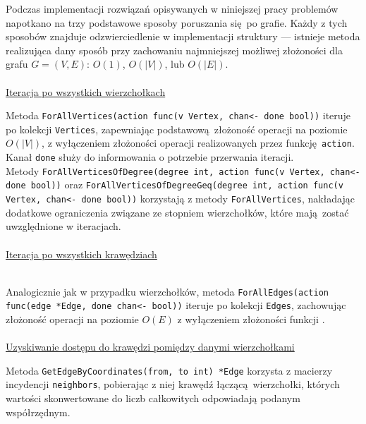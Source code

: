 {  Podczas implementacji rozwiązań opisywanych w niniejszej pracy problemów napotkano na trzy podstawowe sposoby poruszania się po grafie.
  Każdy z tych sposobów znajduje odzwierciedlenie w implementacji struktury --- istnieje metoda realizująca dany sposób przy zachowaniu najmniejszej możliwej złożoności dla grafu $G=(V, E)$: $O(1)$, $O(|V|)$, lub $O(|E|)$.
  \\\\\underline{Iteracja po wszystkich wierzchołkach}\\
  \par{
      Metoda \texttt{ForAllVertices(action func(v Vertex, chan<- done bool))} iteruje po kolekcji \texttt{Vertices}, zapewniając  podstawową złożoność operacji na poziomie $O(|V|)$, z wyłączeniem złożoności operacji realizowanych przez funkcję \texttt{action}. Kanał \texttt{done} służy do informowania o potrzebie przerwania iteracji.\\
      Metody \texttt{ForAllVerticesOfDegree(degree int, action func(v Vertex, chan<- done bool))} oraz \texttt{ForAllVerticesOfDegreeGeq(degree int, action func(v Vertex, chan<- done bool))} korzystają z metody \texttt{ForAllVertices}, nakładając dodatkowe ograniczenia związane ze stopniem wierzchołków, które mają zostać uwzględnione w iteracjach.
  }
  \\\\\underline{Iteracja po wszystkich krawędziach}\\\
  \par{
      Analogicznie jak w przypadku wierzchołków, metoda \texttt{ForAllEdges(action func(edge *Edge, done chan<- bool))} iteruje po kolekcji \texttt{Edges}, zachowując złożoność operacji na poziomie $O(E)$ z wyłączeniem złożoności funkcji .
  }
  \\\\\underline{Uzyskiwanie dostępu do krawędzi pomiędzy danymi wierzchołkami}\\
  \par{
      Metoda \texttt{GetEdgeByCoordinates(from, to int) *Edge} korzysta z macierzy incydencji \texttt{neighbors}, pobierając z niej krawędź łączącą wierzchołki, których wartości skonwertowane do liczb całkowitych odpowiadają podanym współrzędnym.

}}
